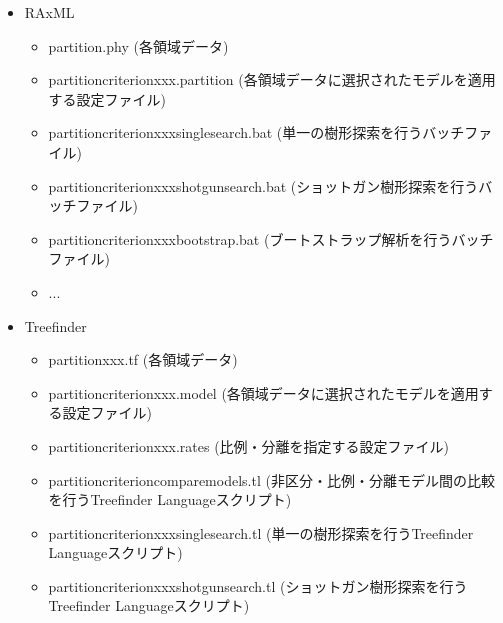 \documentclass[titlepage,10pt,a4paper]{jsbook}
\begin{document}
\begin{itemize}
\begin{itemize}
\begin{itemize}
\item partition{\textunderscore}criterion{\textunderscore}shotgunsearch.bat (ショットガン樹形探索を行うバッチファイル)
\item partition{\textunderscore}criterion{\textunderscore}bootstrap.bat (ブートストラップ解析を行うバッチファイル)
\item partition{\textunderscore}criterion{\textunderscore}shotgunbootstrap.bat (ショットガンブートストラップ解析を行うバッチファイル)
\item ...
\end{itemize}
\item RAxML
\begin{itemize}
\item partition.phy (各領域データ)
\item partition{\textunderscore}criterion{\textunderscore}xxx.partition (各領域データに選択されたモデルを適用する設定ファイル)
\item partition{\textunderscore}criterion{\textunderscore}xxx{\textunderscore}singlesearch.bat (単一の樹形探索を行うバッチファイル)
\item partition{\textunderscore}criterion{\textunderscore}xxx{\textunderscore}shotgunsearch.bat (ショットガン樹形探索を行うバッチファイル)
\item partition{\textunderscore}criterion{\textunderscore}xxx{\textunderscore}bootstrap.bat (ブートストラップ解析を行うバッチファイル)
\item ...
\end{itemize}
\item Treefinder
\begin{itemize}
\item partition{\textunderscore}xxx.tf (各領域データ)
\item partition{\textunderscore}criterion{\textunderscore}xxx.model (各領域データに選択されたモデルを適用する設定ファイル)
\item partition{\textunderscore}criterion{\textunderscore}xxx.rates (比例・分離を指定する設定ファイル)
\item partition{\textunderscore}criterion{\textunderscore}comparemodels.tl (非区分・比例・分離モデル間の比較を行うTreefinder Languageスクリプト)
\item partition{\textunderscore}criterion{\textunderscore}xxx{\textunderscore}singlesearch.tl (単一の樹形探索を行うTreefinder Languageスクリプト)
\item partition{\textunderscore}criterion{\textunderscore}xxx{\textunderscore}shotgunsearch.tl (ショットガン樹形探索を行うTreefinder Languageスクリプト)

\end{itemize}
\end{itemize}
\end{itemize}
\end{document}
